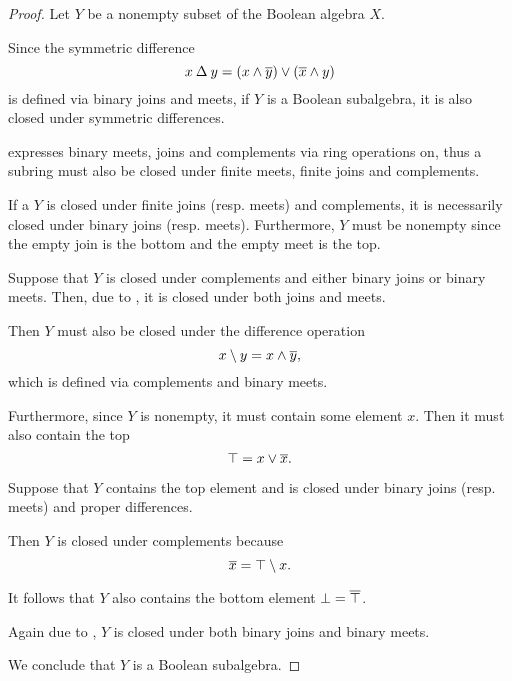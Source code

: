\begin{proof}
  Let \( Y \) be a nonempty subset of the Boolean algebra \( X \).

   Since the symmetric difference
  \begin{equation*}
    x \symdiff y = (x \wedge \oline y) \vee (\oline x \wedge y)
  \end{equation*}
  is defined via binary joins and meets, if \( Y \) is a Boolean subalgebra, it is also closed under symmetric differences.

    expresses binary meets, joins and complements via ring operations on, thus a subring must also be closed under finite meets, finite joins and complements.

   If a \( Y \) is closed under finite joins (resp. meets) and complements, it is necessarily closed under binary joins (resp. meets). Furthermore, \( Y \) must be nonempty since the empty join is the bottom and the empty meet is the top.

   Suppose that \( Y \) is closed under complements and either binary joins or binary meets. Then, due to , it is closed under both joins and meets.

  Then \( Y \) must also be closed under the difference operation
  \begin{equation*}
    x \setminus y = x \wedge \oline y,
  \end{equation*}
  which is defined via complements and binary meets.

  Furthermore, since \( Y \) is nonempty, it must contain some element \( x \). Then it must also contain the top
  \begin{equation*}
    \top = x \vee \oline x.
  \end{equation*}

   Suppose that \( Y \) contains the top element and is closed under binary joins (resp. meets) and proper differences.

  Then \( Y \) is closed under complements because
  \begin{equation*}
    \oline x = \top \setminus x.
  \end{equation*}

  It follows that \( Y \) also contains the bottom element \( \bot = \oline \top \).

  Again due to , \( Y \) is closed under both binary joins and binary meets.

  We conclude that \( Y \) is a Boolean subalgebra.
\end{proof}

